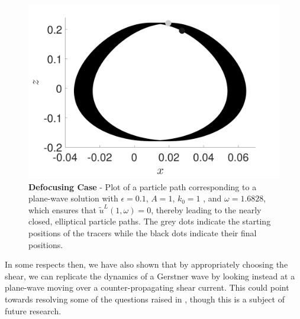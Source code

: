 \documentclass{JFM_Style/jfm}
\begin{document}
\begin{figure}
\centering
\includegraphics[width=.48\textwidth]{om_val_1pt7_k0_1_ep_pt1_defoc_ztrack_pwave}
\caption{\small {\bf Defocusing Case} - Plot of a particle path corresponding to a plane-wave solution with $\epsilon=0.1$, $A=1$, $k_{0}=1$ , and $\omega=1.6828$, which ensures that $\tilde{u}^{L}(1,\omega)=0$, thereby leading to the nearly closed, elliptical particle paths.  The grey dots indicate the starting positions of the tracers while the black dots indicate their final positions.  }
\label{fig:pwavezdrift}
\end{figure}  

In some respects then, we have also shown that by appropriately choosing the shear, we can replicate the dynamics of a Gerstner wave \cite{constantin} by looking instead at a plane-wave moving over a counter-propagating shear current.  This could point towards resolving some of the questions raised in \cite{monismith,smith}, though this is a subject of future research.  
\end{document}

